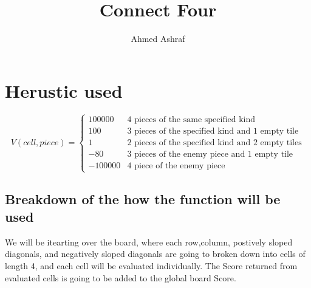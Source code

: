 \documentclass{article}
\title{Connect Four}
\author{Ahmed Ashraf}
\date{}
\begin{document}
\maketitle

\section{Herustic used}
 {
  \begin{equation*}
      V(cell,piece) = \begin{cases}
          100000  & \text{4 pieces of the same specified kind}              \\
          100     & \text{3 pieces of the specified kind and 1 empty tile}  \\
          1       & \text{2 pieces of the specified kind and 2 empty tiles} \\
          -80     & \text{3 pieces of the enemy piece and 1 empty tile}     \\
          -100000 & \text{4 piece of the enemy piece}
      \end{cases}
  \end{equation*}
 }

\subsection{Breakdown of the how the function will be used}
We will be itearting over the board, where each row,column, postively sloped diagonals, and negatively sloped diagonals are going to broken down into cells of length 4, and each cell will be evaluated individually. The Score returned from evaluated cells is going to be added to the global board Score.
\end{document}
